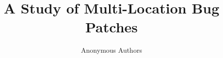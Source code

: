 \documentclass[10pt, conference]{IEEEtran}
\begin{document}
\title{A Study of Multi-Location Bug Patches}

\author{Anonymous Authors}


\maketitle
\end{document}
